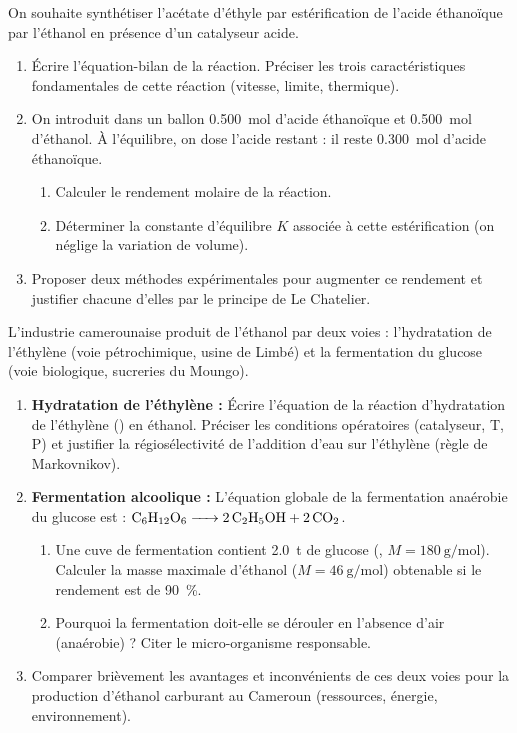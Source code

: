 \documentclass[11pt]{article}
\begin{document}
\begin{exercice}
On souhaite synthétiser l'acétate d'éthyle par estérification de l'acide éthanoïque par l'éthanol en présence d'un catalyseur acide.
\begin{enumerate}
    \item Écrire l'équation-bilan de la réaction. Préciser les trois caractéristiques fondamentales de cette réaction (vitesse, limite, thermique).
    \item On introduit dans un ballon \SI{0,500}{\mol} d'acide éthanoïque et \SI{0,500}{\mol} d'éthanol. À l'équilibre, on dose l'acide restant : il reste \SI{0,300}{\mol} d'acide éthanoïque.
    \begin{enumerate}
        \item Calculer le rendement molaire de la réaction.
        \item Déterminer la constante d'équilibre $K$ associée à cette estérification (on néglige la variation de volume).
    \end{enumerate}
    \item Proposer deux méthodes expérimentales pour augmenter ce rendement et justifier chacune d'elles par le principe de Le Chatelier.
\end{enumerate}
\end{exercice}

\begin{exercice}
L'industrie camerounaise produit de l'éthanol par deux voies : l'hydratation de l'éthylène (voie pétrochimique, usine de Limbé) et la fermentation du glucose (voie biologique, sucreries du Moungo).
\begin{enumerate}
    \item \textbf{Hydratation de l'éthylène :} Écrire l'équation de la réaction d'hydratation de l'éthylène () en éthanol. Préciser les conditions opératoires (catalyseur, T, P) et justifier la régiosélectivité de l'addition d'eau sur l'éthylène (règle de Markovnikov).
    \item \textbf{Fermentation alcoolique :} L'équation globale de la fermentation anaérobie du glucose est : $\ce{C6H12O6 -> 2 C2H5OH + 2 CO2}$.
    \begin{enumerate}
        \item Une cuve de fermentation contient \SI{2,0}{\tonne} de glucose (, $M = \SI{180}{\gram\per\mol}$). Calculer la masse maximale d'éthanol ($M = \SI{46}{\gram\per\mol}$) obtenable si le rendement est de \SI{90}{\%}.
        \item Pourquoi la fermentation doit-elle se dérouler en l'absence d'air (anaérobie) ? Citer le micro-organisme responsable.
    \end{enumerate}
    \item Comparer brièvement les avantages et inconvénients de ces deux voies pour la production d'éthanol carburant au Cameroun (ressources, énergie, environnement).
\end{enumerate}
\end{exercice}
\end{document}
